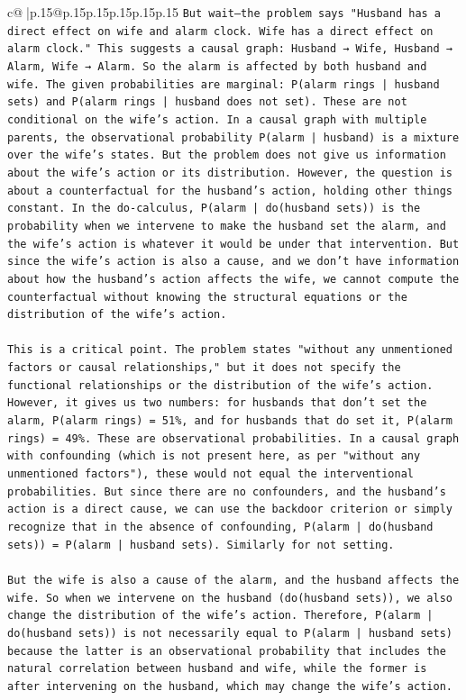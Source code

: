 \documentclass{article}
\begin{document}
{\begin{supertabular}{c@{$\;$}|p{.15\linewidth}@{}p{.15\linewidth}p{.15\linewidth}p{.15\linewidth}p{.15\linewidth}p{.15\linewidth}}
{{{\texttt{But wait—the problem says "Husband has a direct effect on wife and alarm clock. Wife has a direct effect on alarm clock." This suggests a causal graph: Husband → Wife, Husband → Alarm, Wife → Alarm. So the alarm is affected by both husband and wife. The given probabilities are marginal: P(alarm rings | husband sets) and P(alarm rings | husband does not set). These are not conditional on the wife's action. In a causal graph with multiple parents, the observational probability P(alarm | husband) is a mixture over the wife's states. But the problem does not give us information about the wife's action or its distribution. However, the question is about a counterfactual for the husband's action, holding other things constant. In the do{-}calculus, P(alarm | do(husband sets)) is the probability when we intervene to make the husband set the alarm, and the wife's action is whatever it would be under that intervention. But since the wife's action is also a cause, and we don't have information about how the husband's action affects the wife, we cannot compute the counterfactual without knowing the structural equations or the distribution of the wife's action.} \\
\\ 
\texttt{This is a critical point. The problem states "without any unmentioned factors or causal relationships," but it does not specify the functional relationships or the distribution of the wife's action. However, it gives us two numbers: for husbands that don't set the alarm, P(alarm rings) = 51\%, and for husbands that do set it, P(alarm rings) = 49\%. These are observational probabilities. In a causal graph with confounding (which is not present here, as per "without any unmentioned factors"), these would not equal the interventional probabilities. But since there are no confounders, and the husband's action is a direct cause, we can use the backdoor criterion or simply recognize that in the absence of confounding, P(alarm | do(husband sets)) = P(alarm | husband sets). Similarly for not setting.} \\
\\ 
\texttt{But the wife is also a cause of the alarm, and the husband affects the wife. So when we intervene on the husband (do(husband sets)), we also change the distribution of the wife's action. Therefore, P(alarm | do(husband sets)) is not necessarily equal to P(alarm | husband sets) because the latter is an observational probability that includes the natural correlation between husband and wife, while the former is after intervening on the husband, which may change the wife's action.} \\
}}}
\end{supertabular}}
\end{document}
